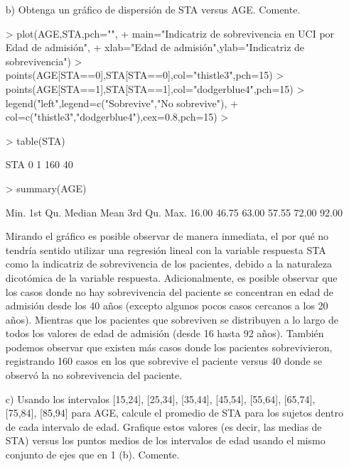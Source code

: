 \documentclass[11pt,onside]{article}
\begin{document}
\begin{itemize}
\item[b)] Obtenga un gráfico de dispersión de STA versus AGE. Comente.


\begin{Schunk}
\begin{Sinput}
> plot(AGE,STA,pch="",
+      main="Indicatriz de sobrevivencia en UCI por Edad de admisión",
+      xlab="Edad de admisión",ylab="Indicatriz de sobrevivencia")
> points(AGE[STA==0],STA[STA==0],col="thistle3",pch=15)
> points(AGE[STA==1],STA[STA==1],col="dodgerblue4",pch=15)
> legend("left",legend=c("Sobrevive","No sobrevive"),
+        col=c("thistle3","dodgerblue4"),cex=0.8,pch=15)
> 
\end{Sinput}
\end{Schunk}


\begin{Schunk}
\begin{Sinput}
> table(STA)
\end{Sinput}
\begin{Soutput}
STA
  0   1 
160  40 
\end{Soutput}
\begin{Sinput}
> summary(AGE)
\end{Sinput}
\begin{Soutput}
   Min. 1st Qu.  Median    Mean 3rd Qu.    Max. 
  16.00   46.75   63.00   57.55   72.00   92.00 
\end{Soutput}
\end{Schunk}

Mirando el gráfico es posible observar de manera inmediata, el por qué no tendría sentido utilizar una regresión lineal con la variable respuesta STA como la indicatriz de sobrevivencia de los pacientes, debido a la naturaleza dicotómica de la variable respuesta. Adicionalmente, es posible observar que los casos donde no hay sobrevivencia del paciente se concentran en edad de admisión desde los 40 años (excepto algunos pocos casos cercanos a los 20 años). Mientras que los pacientes que sobreviven se distribuyen a lo largo de todos los valores de edad de admisión (desde 16 hasta 92 años). También podemos observar que existen más casos donde los pacientes sobrevivieron, registrando 160 casos en los que sobrevive el paciente versus 40 donde se observó la no sobrevivencia del paciente.

\item[c)] Usando los intervalos [15,24], [25,34], [35,44], [45,54], [55,64], [65,74], [75,84], [85,94] para AGE, calcule el promedio de STA para los sujetos dentro de cada intervalo de edad. Grafique estos valores (es decir, las medias de STA) versus los puntos medios de los intervalos de edad usando el mismo conjunto de ejes que en 1 (b). Comente.


\end{itemize}
\end{document}
